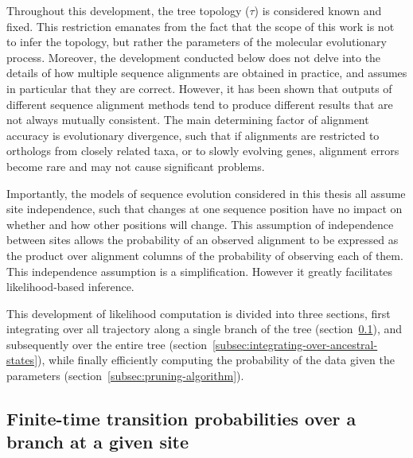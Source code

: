 Throughout this development, the tree topology ($\tau$) is considered known and fixed.
This restriction emanates from the fact that the scope of this work is not to infer the topology, but rather the parameters of the molecular evolutionary process.
Moreover, the development conducted below does not delve into the details of how multiple sequence alignments are obtained in practice, and assumes in particular that they are correct.
However, it has been shown that outputs of different sequence alignment methods tend to produce different results that are not always mutually consistent.
The main determining factor of alignment accuracy is evolutionary divergence, such that if alignments are restricted to orthologs from closely related taxa, or to slowly evolving genes, alignment errors become rare and may not cause significant problems.

Importantly, the models of sequence evolution considered in this thesis all assume site independence, such that changes at one sequence position have no impact on whether and how other positions will change.
This assumption of independence between sites allows the probability of an observed alignment to be expressed as the product over alignment columns of the probability of observing each of them.
This independence assumption is a simplification.
However it greatly facilitates likelihood-based inference.

This development of likelihood computation is divided into three sections, first integrating over all trajectory along a single branch of the tree (section~\ref{subsec:finite-time-transition-probabilities-over-a-branch-at-a-given-site}),
and subsequently over the entire tree (section~\ref{subsec:integrating-over-ancestral-states}),
while finally efficiently computing the probability of the data given the parameters (section~\ref{subsec:pruning-algorithm}).

\subsection{Finite-time transition probabilities over a branch at a given site}
\label{subsec:finite-time-transition-probabilities-over-a-branch-at-a-given-site}

